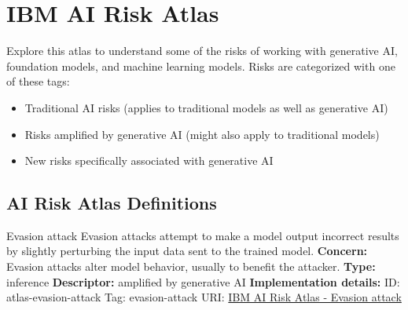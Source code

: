 \documentclass[a4paper,12pt]{article}
\begin{document}
\section{IBM AI Risk Atlas}
Explore this atlas to understand some of the risks of working with generative AI, foundation models, and machine learning models. Risks are categorized with one of these tags:
\begin{itemize}
\item Traditional AI risks (applies to traditional models as well as generative AI)
\item Risks amplified by generative AI (might also apply to traditional models)
\item New risks specifically associated with generative AI
\end{itemize}
\subsection*{AI Risk Atlas Definitions}
\begin{definitionbox}{Evasion attack}
Evasion attacks attempt to make a model output incorrect results by slightly perturbing the input data sent to the trained model.\newline\newline
\textbf{Concern: }Evasion attacks alter model behavior, usually to benefit the attacker.\newline\newline
\textbf{Type: }inference\newline
\textbf{Descriptor: }amplified by generative AI \newline\newline
\textbf{Implementation details: } \newline
ID: atlas-evasion-attack \newline
Tag: evasion-attack \newline
URI:  \href{https://www.ibm.com/docs/en/watsonx/saas?topic=SSYOK8/wsj/ai-risk-atlas/evasion-attack.html}{IBM AI Risk Atlas - Evasion attack}\newline
\end{definitionbox}
\end{document}

